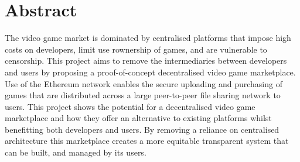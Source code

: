 \section*{Abstract}

The video game market is dominated by centralised platforms that impose high costs on developers, limit use rownership of games, and are vulnerable to censorship. This project aims to remove the intermediaries between developers and users by proposing a proof-of-concept decentralised video game marketplace. Use of the Ethereum network enables the secure uploading and purchasing of games that are distributed across a large peer-to-peer file sharing network to users.
\x
This project shows the potential for a decentralised video game marketplace and how they offer an alternative to existing platforms whilst benefitting both developers and users. By removing a reliance on centralised architecture this marketplace creates a more equitable transparent system that can be built, and managed by its users.